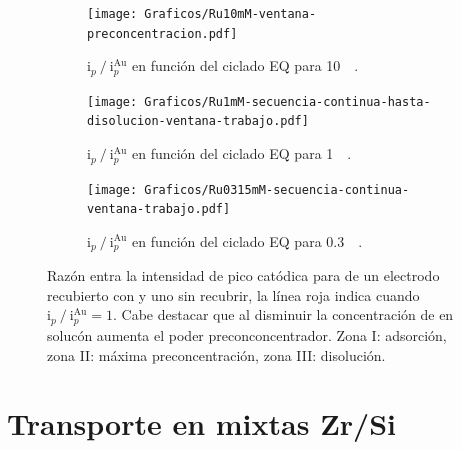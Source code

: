 		 	\begin{figure}[t!]
	 	   	    \begin{subfigure}[t]{0.495\textwidth}
		        	\texttt{[image: Graficos/Ru10mM-ventana-preconcentracion.pdf]}
		       		\vspace*{-0.3cm}
		       		\caption{$\text{i}_p\mathbin{/}\text{i}_p^{\text{Au}}$ en función del ciclado EQ para \ru\space \SI{10}{\milli\Molar}.}
		         	\label{fig:Ventana_Ru10mM}
		     		\end{subfigure}
	     		\begin{subfigure}[t]{0.495\textwidth}
		        	\texttt{[image: Graficos/Ru1mM-secuencia-continua-hasta-disolucion-ventana-trabajo.pdf]}
		       		\vspace*{-0.3cm}
		       		\caption{$\text{i}_p\mathbin{/}\text{i}_p^{\text{Au}}$ en función del ciclado EQ para \ru\space \SI{1}{\milli\Molar}.}
		         	\label{fig:Ventana_Ru1mM}
		     		\end{subfigure}
	     		\begin{center}
	     		\begin{subfigure}[t]{0.495\textwidth}
		        	\vspace*{-0.3cm}
		        	\texttt{[image: Graficos/Ru0315mM-secuencia-continua-ventana-trabajo.pdf]}
		       		\vspace*{-0.3cm}
		       		\caption{$\text{i}_p\mathbin{/}\text{i}_p^{\text{Au}}$ en función del ciclado EQ para \ru\space \SI{0.3}{\milli\Molar}.}
		         	\label{fig:Ventana_Ru0315mM}
		     		\end{subfigure}
		     		\end{center}
	 	   	   	\vspace*{-0.3cm}
	 	   	   	\caption[Intensidad en función del ciclado EQ para \pdmF]{Razón entra la intensidad de pico catódica para \ru\space de un electrodo recubierto con \pdm\space y uno sin recubrir, la línea roja indica cuando $\text{i}_p\mathbin{/}\text{i}_p^{\text{Au}} = 1$. Cabe destacar que al disminuir la concentración de \ru\space en solucón aumenta el poder preconconcentrador. Zona I: adsorción, zona II: máxima preconcentración, zona III: disolución.}
	     		\label{fig:ventanas}
	     	  \end{figure}

	\section{Transporte en \pdm\space mixtas Zr/Si}

